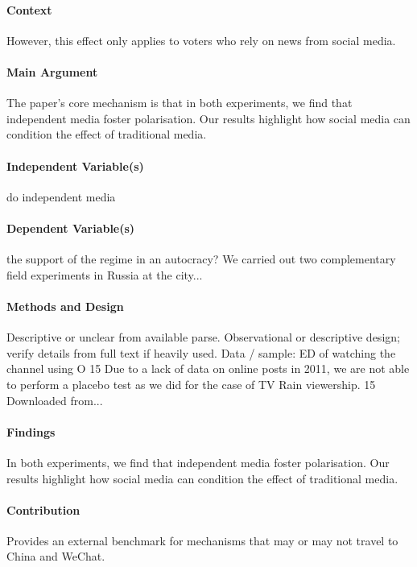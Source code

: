 \documentclass[12pt]{article}
\begin{document}
\paragraph{Context} However, this effect only applies to voters who rely on news from social media.

\paragraph{Main Argument} The paper's core mechanism is that in both experiments, we find that independent media foster polarisation. Our results highlight how social media can condition the effect of traditional media.

\paragraph{Independent Variable(s)} do independent media

\paragraph{Dependent Variable(s)} the support of the regime in an autocracy? We carried out two complementary field experiments in Russia at the city...

\paragraph{Methods and Design} Descriptive or unclear from available parse. Observational or descriptive design; verify details from full text if heavily used. Data / sample: ED of watching the channel using O 15 Due to a lack of data on online posts in 2011, we are not able to perform a placebo test as we did for the case of TV Rain viewership. 15 Downloaded from...

\paragraph{Findings} In both experiments, we find that independent media foster polarisation. Our results highlight how social media can condition the effect of traditional media.

\paragraph{Contribution} Provides an external benchmark for mechanisms that may or may not travel to China and WeChat.
\end{document}
